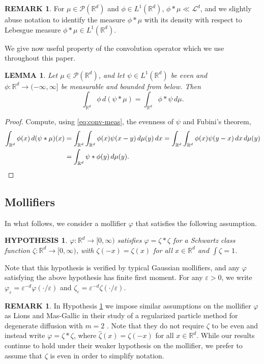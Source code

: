 \documentclass[11pt,leqno]{amsart}
\newtheorem{lem}[thm]{LEMMA}
\newtheorem{hyp}{HYPOTHESIS}
\theoremstyle{definition}
\newtheorem{remark}[thm]{REMARK}
\newcommand{\bes}{\begin{equation*}}
\newcommand{\ees}{\end{equation*}}
\newcommand{\R}{{\mathord{\mathbb R}}}
\newcommand{\Rd}{{\mathord{\mathbb R}^d}}
\def\P{{\mathcal P}}
\def\epsilon{\varepsilon}
\def\e{\varepsilon}
\newcommand{\ird}{\int_{\mathord{\mathbb R}^d}}
\begin{document}
\begin{remark} \label{rem:properties}
	For $\mu \in \P(\Rd)$ and $\phi \in L^1(\Rd)$, $\phi*\mu \ll \mathcal{L}^d$, and we slightly abuse notation to identify the measure $\phi*\mu$ with its density with respect to Lebesgue measure  $\phi*\mu \in L^1(\Rd)$. %
\end{remark}

We give now useful property of the convolution operator which we use throughout this paper.
\begin{lem} \label{convolutionlemma}
	Let $\mu\in\P(\R^d)$, and let $\psi\in L^1(\R^d)$ be even and $\phi\colon\R^d \to (-\infty,\infty]$ be measurable and bounded from below. Then
\bes
	\ird \phi \,d(\psi*\mu) = \ird \phi*\psi \,d\mu.
\ees
\end{lem}
\begin{proof}
	Compute, using \eqref{eq:conv-meas}, the evenness of $\psi$ and Fubini's theorem,
\begin{align*}
	\ird \phi(x) \,d(\psi*\mu)(x) &= \ird \ird \phi(x) \psi(x-y) \,d\mu(y) \,dx = \ird \ird \phi(x) \psi(y-x) \,dx \,d\mu(y)\\
	&= \ird \psi*\phi(y) \,d\mu(y). \qedhere
\end{align*}
\end{proof}

\subsection{Mollifiers}
In what follows, we consider a mollifier $\varphi$ that satisfies the following assumption.
\begin{hyp} \label{mollifierAssumption}
$\varphi\colon\Rd \to [0,\infty)$ satisfies $\varphi = \zeta * \zeta$ for a Schwartz class function $\zeta: \Rd \to [0,\infty)$, with $\zeta(-x) = \zeta(x)$ for all $x\in\Rd$ and $\int \zeta = 1$.  \end{hyp}
Note that this hypothesis is verified by typical Gaussian mollifiers, and any $\varphi$ satisfying the above hypothesis has finite first moment. For any $\epsilon >0$, we write $\varphi_\e =  \e^{-d} \varphi (\cdot/\e)$ and $\zeta_\e = \e^{-d} \zeta(\cdot/\e)$.

\begin{remark}
	In Hypothesis \ref{mollifierAssumption} we impose similar assumptions on the mollifier $\varphi$ as Lions and Mas-Gallic in their study of a regularized particle method for degenerate diffusion with $m=2$ \cite{LionsMasGallic}. Note that they do not require $\zeta$ to be even and instead write $\varphi = \hat{\zeta}*\zeta$, where $\hat{\zeta}(x) = \zeta(-x)$ for all $x\in\R^d$. While our results continue to hold under their weaker hypothesis on the mollifier, we prefer to assume that $\zeta$ is even in order to simplify notation.
\end{remark}
\end{document}
